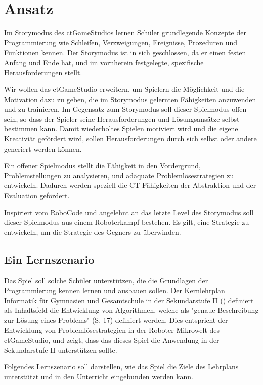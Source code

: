\chapter{Ansatz}

Im Storymodus des ctGameStudios lernen Schüler grundlegende Konzepte der Programmierung wie
Schleifen, Verzweigungen, Ereignisse, Prozeduren und Funktionen kennen. Der Storymodus ist in sich
geschlossen, da er einen festen Anfang und Ende hat, und im vornherein festgelegte, spezifische
Herausforderungen stellt.

Wir wollen das ctGameStudio erweitern, um Spielern die Möglichkeit und die Motivation dazu zu geben,
die im Storymodus gelernten Fähigkeiten anzuwenden und zu trainieren. Im Gegensatz zum Storymodus
soll dieser Spielmodus offen sein, so dass der Spieler seine Herausforderungen und Lösungsansätze
selbst bestimmen kann. Damit wiederholtes Spielen motiviert wird und die eigene Kreativiät gefördert
wird, sollen Herausforderungen durch sich selbst oder andere generiert werden können. 

Ein offener Spielmodus stellt die Fähigkeit in den Vordergrund, Problemstellungen zu analysieren,
und adäquate Problemlösestrategien zu entwickeln. Dadurch werden speziell die CT-Fähigkeiten der
Abstraktion und der Evaluation gefördert.

Inspiriert vom RoboCode und angelehnt an das letzte Level des Storymodus soll dieser Spielmodus aus
einem Roboterkampf bestehen. Es gilt, eine Strategie zu entwickeln, um die Strategie des Gegners zu
überwinden.

\section{Ein Lernszenario}

Das Spiel soll solche Schüler unterstützen, die die Grundlagen der Programmierung kennen lernen und
ausbauen sollen. Der Kernlehrplan Informatik für Gymnasien und Gesamtschule in der Sekundarstufe II
(\cite{SchulministeriumNRW2014}) definiert als Inhaltsfeld die Entwicklung von Algorithmen, welche
als "genaue Beschreibung zur Lösung eines Problems" (S. 17) definiert werden. Dies entspricht
der Entwicklung von Problemlösestrategien in der Roboter-Mikrowelt des ctGameStudio, und zeigt, dass
das dieses Spiel die Anwendung in der Sekundarstufe II unterstützen sollte.

Folgendes Lernszenario soll darstellen, wie das Spiel die Ziele des Lehrplans unterstützt und in den
Unterricht eingebunden werden kann.


